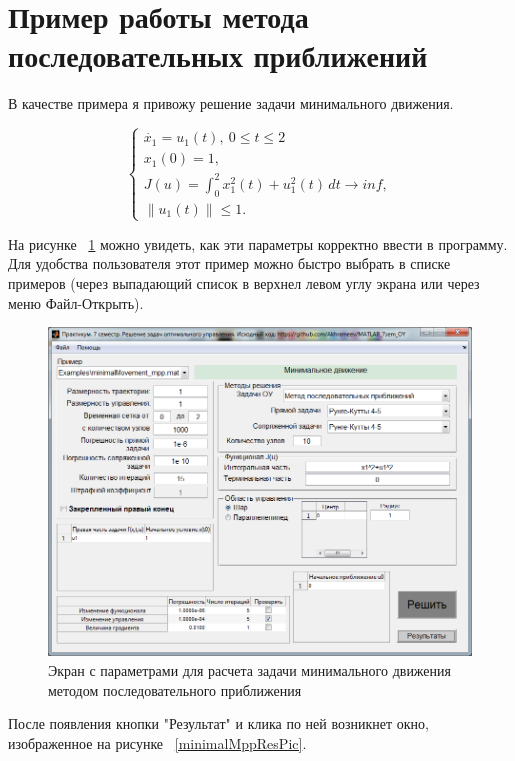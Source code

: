 \documentclass[oneside,final,12pt]{extreport}
\begin{document}
\section{Пример работы метода последовательных приближений}
 
В качестве примера я привожу решение задачи минимального движения.

$$
\begin{cases}
\dot{x_1}=u_1(t), \ 0 \leqslant t \leqslant 2\\ 
x_1(0)=1,\\
J(u)=\int_0^2 x_1^2(t) + u_1^2(t) \, dt\rightarrow inf,\\
\|u_1(t)\|\leqslant1.
\end{cases}
$$

На рисунке ~\ref {minimalMppPic} можно увидеть, как эти параметры корректно ввести в программу. Для удобства пользователя этот пример можно быстро выбрать в списке примеров (через выпадающий список в верхнел левом углу экрана или через меню Файл-Открыть).

\begin{figure}[!h]
\centering
\includegraphics[scale=0.7]{minimalMovement_mpp.png}
\caption{Экран с параметрами для расчета задачи минимального движения методом последовательного приближения}
\label{minimalMppPic}
\end{figure}

После появления кнопки "Результат" и клика по ней возникнет окно, изображенное на рисунке ~\ref {minimalMppResPic}.
 
\end{document}
